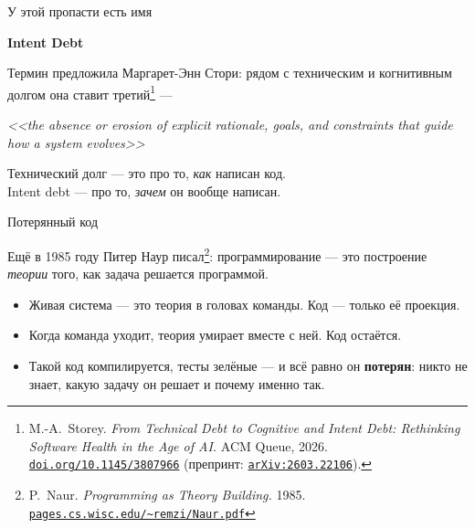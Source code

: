 \documentclass[11pt, aspectratio=169]{beamer}
\begin{document}
\begin{frame}{У этой пропасти есть имя}
  \vspace{0.2cm}

  \begin{center}
  {\Huge \textbf{Intent Debt}}
  \end{center}

  \vspace{0.3cm}

  Термин предложила Маргарет-Энн Стори: рядом с техническим и когнитивным долгом
  она ставит третий\footnote{M.-A.\ Storey. \textit{From Technical Debt to Cognitive
  and Intent Debt: Rethinking Software Health in the Age of AI.} ACM Queue, 2026.
  \href{https://doi.org/10.1145/3807966}{\texttt{doi.org/10.1145/3807966}}
  (препринт: \href{https://arxiv.org/abs/2603.22106}{\texttt{arXiv:2603.22106}}).} ---

  \vspace{0.3cm}

  \begin{center}
  \begin{minipage}{0.85\textwidth}
  \small
  \textit{<<the absence or erosion of explicit rationale, goals,
  and constraints that guide how a system evolves>>}
  \end{minipage}
  \end{center}

  \vspace{0.35cm}

  \begin{center}
  \footnotesize\textcolor{mutedText}{%
    Технический долг --- это про то, \emph{как} написан код.\\
    Intent debt --- про то, \emph{зачем} он вообще написан.
  }
  \end{center}
\end{frame}

\begin{frame}{Потерянный код}
  \vspace{0.1cm}

  Ещё в 1985 году Питер Наур писал\footnote{P.\ Naur. \textit{Programming as Theory
  Building.} 1985.
  \href{https://pages.cs.wisc.edu/~remzi/Naur.pdf}{\texttt{pages.cs.wisc.edu/\textasciitilde remzi/Naur.pdf}}}:
  программирование --- это построение \emph{теории} того,
  как задача решается программой.

  \vspace{0.3cm}

  \begin{itemize}
    \setlength\itemsep{0.35em}
    \item Живая система --- это теория в головах команды. Код --- только её проекция.
    \item Когда команда уходит, теория умирает вместе с ней. Код остаётся.
    \item Такой код компилируется, тесты зелёные --- и всё равно он \textbf{потерян}:
          никто не знает, какую задачу он решает и почему именно так.
  \end{itemize}
\end{frame}
\end{document}
